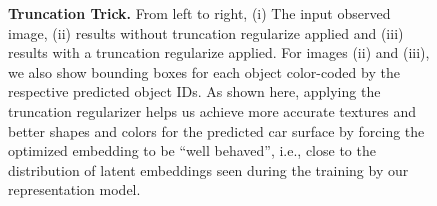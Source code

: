 \begin{figure}[t!]
	\centering
{}
\caption{\textbf{Truncation Trick.} From left to right, (i) The input observed image, (ii) results without truncation regularize applied and (iii) results with a truncation regularize applied. For images (ii) and (iii), we also show bounding boxes for each object color-coded by the respective predicted object IDs. As shown here, applying the truncation regularizer helps us achieve more accurate textures and better shapes and colors for the predicted car surface by forcing the optimized embedding to be ``well behaved'', i.e., close to the distribution of latent embeddings seen during the training by our representation model.}
\label{fig:optimization_truncation}
\end{figure}



